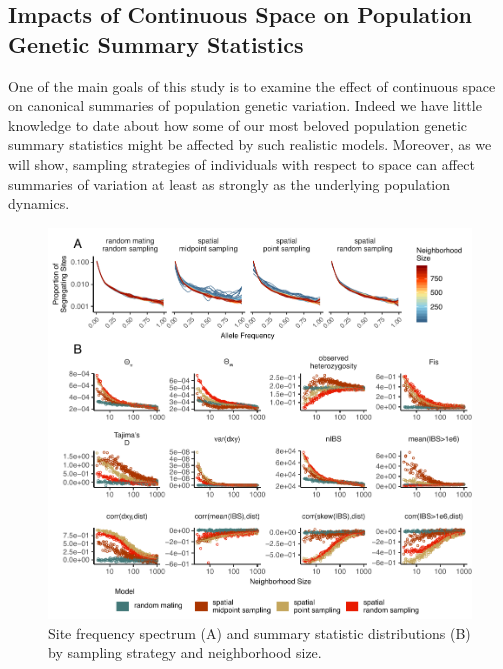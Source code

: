 \documentclass[11pt,twoside,lineno]{preprint}
\begin{document}
\subsection{Impacts of Continuous Space on Population Genetic Summary Statistics}
One of the main goals of this study is to examine the effect of continuous space on canonical summaries of population genetic variation. Indeed we have little knowledge to date about how some of our most beloved population genetic summary statistics might be affected by such realistic models. Moreover, as we will show, sampling strategies of individuals with respect to space can affect summaries of variation at least as strongly as the underlying population dynamics. 


\begin{figure}[p]
\centering
\includegraphics[width=\textwidth]{figures/sfs_w_sumstats.pdf}
\caption{Site frequency spectrum (A) and summary statistic distributions (B) by sampling strategy and neighborhood size.}
\label{fig:sumstats}
\end{figure}
\end{document}
